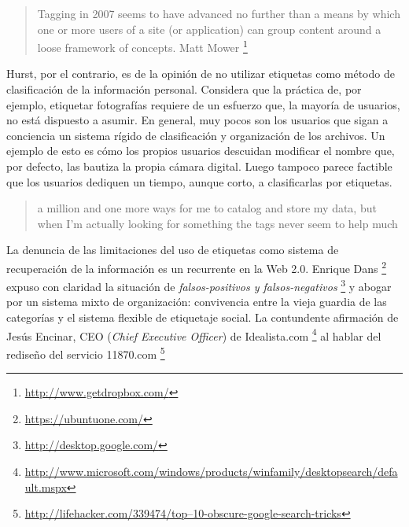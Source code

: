 \documentclass[12pt, a4paper,twoside]{book}
\begin{document}
\begin{quote}
Tagging in 2007 seems to have advanced no further than a means by
which one or more users of a site (or application) can group
content around a loose framework of concepts. Matt Mower%
\footnote{\href{http://www.getdropbox.com/}{http://www.getdropbox.com/}}

\end{quote}
Hurst, por el contrario, es de la opinión de no utilizar etiquetas
como método de clasificación de la información personal. Considera
que la práctica de, por ejemplo, etiquetar fotografías requiere de
un esfuerzo que, la mayoría de usuarios, no está dispuesto a
asumir. En general, muy pocos son los usuarios que sigan a
conciencia un sistema rígido de clasificación y organización de los
archivos. Un ejemplo de esto es cómo los propios usuarios descuidan
modificar el nombre que, por defecto, las bautiza la propia cámara
digital. Luego tampoco parece factible que los usuarios dediquen un
tiempo, aunque corto, a clasificarlas por etiquetas.

\begin{quote}
a million and one more ways for me to catalog and store my data,
but when I'm actually looking for something the tags never seem to
help much

\end{quote}
La denuncia de las limitaciones del uso de etiquetas como sistema
de recuperación de la información es un recurrente en la Web 2.0.
Enrique Dans%
\footnote{\href{https://ubuntuone.com/}{https://ubuntuone.com/}}
expuso con claridad la situación de
\emph{falsos-positivos y falsos-negativos}%
\footnote{\href{http://desktop.google.com/}{http://desktop.google.com/}}
y abogar por un sistema mixto de organización: convivencia entre la
vieja guardia de las categorías y el sistema flexible de etiquetaje
social. La contundente afirmación de Jesús Encinar, CEO
(\emph{Chief Executive Officer}) de Idealista.com%
\footnote{\href{http://www.microsoft.com/windows/products/winfamily/desktopsearch/default.mspx}{http://www.microsoft.com/windows/products/winfamily/desktopsearch/default.mspx}}
al hablar del rediseño del servicio 11870.com%
\footnote{\href{http://lifehacker.com/339474/top-10-obscure-google-search-tricks}{http://lifehacker.com/339474/top--10-obscure-google-search-tricks}}
\end{document}
